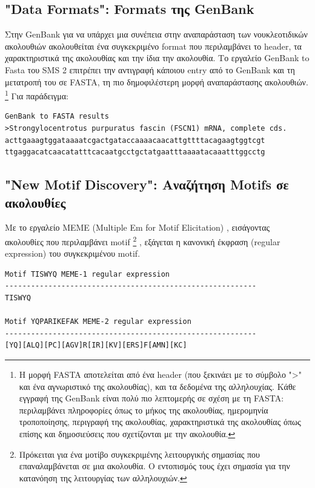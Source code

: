     \subsection{"Data Formats": Formats της GenBank}
        Στην GenBank για να υπάρχει μια συνέπεια στην αναπαράσταση των νουκλεοτιδικών ακολουθιών ακολουθείται ένα συγκεκριμένο format που περιλαμβάνει το header, τα χαρακτηριστικά της ακολουθίας και την ίδια την ακολουθία.
        Το εργαλείο GenBank to Fasta του SMS 2 \cite{GenBankToFASTA} επιτρέπει την αντιγραφή κάποιου entry από το GenBank και τη μετατροπή του σε FASTA, τη πιο δημοφιλέστερη μορφή αναπαράστασης ακολουθιών.
        \footnote{Η μορφή FASTA αποτελείται από ένα header (που ξεκινάει με το σύμβολο ">" και ένα αγνωριστικό της ακολουθίας), και τα δεδομένα της αλληλουχίας.
                Κάθε εγγραφή της GenBank είναι πολύ πιο λεπτομερής σε σχέση με τη FASTA: περιλαμβάνει πληροφορίες όπως το μήκος της ακολουθίας, ημερομηνία τροποποίησης, περιγραφή της ακολουθίας, χαρακτηριστικά της ακολουθίας όπως επίσης και δημοσιεύσεις που σχετίζονται με την ακολουθία.}
        Για παράδειγμα:

\begin{graycomment} \footnotesize
    \begin{verbatim}
GenBank to FASTA results
>Strongylocentrotus purpuratus fascin (FSCN1) mRNA, complete cds.
acttgaaagtggataaaatcgactgataccaaaacaacattgttttacagaagtggtcgt
ttgaggacatcaacatatttcacaatgcctgctatgaatttaaaatacaaatttggcctg\end{verbatim}
\end{graycomment}

    \subsection{"New Motif Discovery": Αναζήτηση Motifs σε ακολουθίες}
        Με το εργαλείο MEME (Multiple Em for Motif Elicitation) \cite{MEME}, εισάγοντας ακολουθίες που περιλαμβάνει motif
        \footnote{Πρόκειται για ένα μοτίβο συγκεκριμένης λειτουργικής σημασίας που επαναλαμβάνεται σε μια ακολουθία.
                Ο εντοπισμός τους έχει σημασία για την κατανόηση της λειτουργίας των αλληλουχιών.}
        , εξάγεται η κανονική έκφραση (regular expression) του συγκεκριμένου motif.

            \begin{graycomment} \footnotesize
            \begin{verbatim}
Motif TISWYQ MEME-1 regular expression
----------------------------------------------------------
TISWYQ

Motif YQPARIKEFAK MEME-2 regular expression
----------------------------------------------------------
[YQ][ALQ][PC][AGV]R[IR][KV][ERS]F[AMN][KC] \end{verbatim}
            \end{graycomment}

